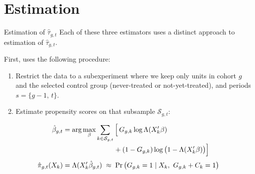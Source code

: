 \documentclass[11pt]{beamer}
\begin{document}
\section{Estimation}

\begin{frame}{Estimation of $\hat{\tau}_{g,t}$}
    Each of these three estimators uses a distinct approach to estimation of $\hat{\tau}_{g,t}$.

    \vspace{2mm}

    First, \cite{callaway2021difference} uses the following procedure:
    \begin{enumerate}
        \item Restrict the data to a subexperiment where we keep only units in
              cohort $g$ and the selected control group (never-treated or
              not-yet-treated), and periods $s = \{g-1,\, t\}$.
        \item Estimate propensity scores on that subsample $\mathcal{S}_{g,t}$:
    \end{enumerate}

    \vspace{-2mm}
    {\small
    \begin{align*}
      \hat\beta_{g,t}
        &= \arg\max_{\beta} \sum_{k \in \mathcal{S}_{g,t}}
           \Big[\, G_{g,k}\log \Lambda(X_k'\beta) \\[-0.5mm]
        &\hspace{26mm}
           + (1 - G_{g,k}) \log\big(1 - \Lambda(X_k'\beta)\big) \Big] \\[1mm]
      \hat\pi_{g,t}(X_k)
        &= \Lambda(X_k'\hat\beta_{g,t})
           \;\approx\; \Pr\big(G_{g,k} = 1 \mid X_k,\ G_{g,k} + C_k = 1\big)
    \end{align*}
    }
\end{frame}
\end{document}

